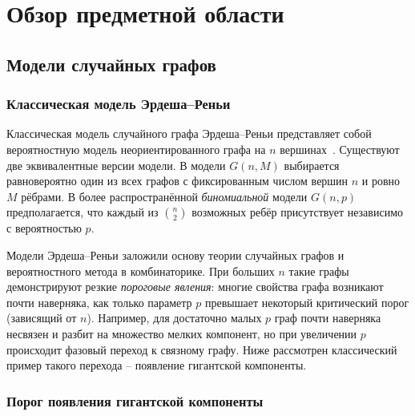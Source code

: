 \chapter{Обзор предметной области}
\label{chap:overview}

\section{Модели случайных графов}
\label{sec:random_graph_models}

\subsection{Классическая модель Эрдеша–Реньи}
\label{subsec:erdos_renyi}

Классическая модель случайного графа Эрдеша–Реньи представляет собой вероятностную модель неориентированного графа на $n$ вершинах~\cite{Erdos1959}. 
Существуют две эквивалентные версии модели. 
В модели $G(n, M)$ выбирается равновероятно один из всех графов с фиксированным числом вершин $n$ и ровно $M$ рёбрами.
В более распространённой \textit{биномиальной} модели $G(n, p)$ предполагается, что каждый из $\binom{n}{2}$ возможных ребёр присутствует независимо с вероятностью $p$.

Модели Эрдеша–Реньи заложили основу теории случайных графов и вероятностного метода в комбинаторике.
При больших $n$ такие графы демонстрируют резкие \textit{пороговые явления}: многие свойства графа возникают почти наверняка, как только параметр $p$ превышает некоторый критический порог (зависящий от $n$).
Например, для достаточно малых $p$ граф почти наверняка несвязен и разбит на множество мелких компонент, но при увеличении $p$ происходит фазовый переход к связному графу.
Ниже рассмотрен классический пример такого перехода – появление гигантской компоненты.

\subsection{Порог появления гигантской компоненты}
\label{subsec:giant_component_threshold}


